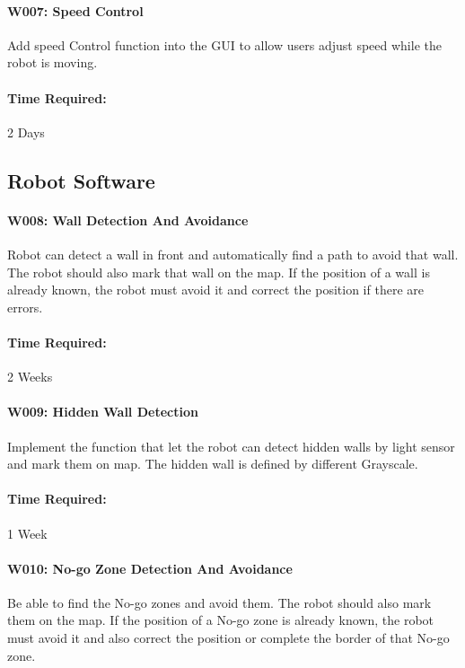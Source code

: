 \documentclass[11pt, a4paper]{report}
\begin{document}
\paragraph{W007: Speed Control}
Add speed Control function into the GUI to allow users adjust speed while the robot is moving.
\paragraph{Time Required:}2 Days\\



\subsection{Robot Software}

\paragraph{W008: Wall Detection And Avoidance}
Robot can detect a wall in front and automatically find a path to avoid that wall. The robot should also mark that wall on the map. If the position of a wall is already known, the robot must avoid it and correct the position if there are errors.
\paragraph{Time Required:}2 Weeks\\


\paragraph{W009: Hidden Wall Detection}
Implement the function that let the robot can detect hidden walls by light sensor and mark them on map. The hidden wall is defined by different Grayscale.
\paragraph{Time Required:}1 Week\\


\paragraph{W010: No-go Zone Detection And Avoidance}
Be able to find the No-go zones and avoid them. The robot should also mark them on the map. If the position of a No-go zone is already known, the robot must avoid it and also correct the position or complete the border of that No-go zone.
\end{document}
